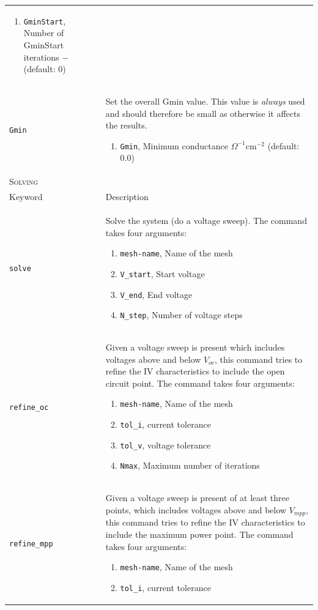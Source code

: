 \documentclass[noshowpacs,preprintnumbers,amsmath,amssymb, letter]{revtex4}
\begin{document}
\begin{longtable}{p{}p{}}
\begin{enumerate}
\item \texttt{GminStart}, Number of GminStart iterations $-$ (default: $0$)
\end{enumerate}\\
\texttt{Gmin} &  Set the overall Gmin value. This value is \emph{always} used and should therefore be small as otherwise it affects the results. 
\begin{enumerate}
\item \texttt{Gmin}, Minimum conductance $\Omega^{-1}\text{cm}^{-2}$ (default: $0.0$)
\end{enumerate}\\
\multicolumn{2}{l}{\textsc{Solving}} \\*
\hline
Keyword & Description \\
\texttt{solve}	&  Solve the system (do a voltage sweep). The command takes four arguments:
\begin{enumerate}
\item \texttt{mesh-name}, Name of the mesh
\item \texttt{V\_start}, Start voltage
\item \texttt{V\_end}, End voltage
\item \texttt{N\_step}, Number of voltage steps
\end{enumerate}\\
\texttt{refine\_oc}	&  Given a voltage sweep is present which includes voltages above and below $V_{oc}$, this command tries to refine the IV characteristics to include the open circuit point. The command takes four arguments:
\begin{enumerate}
\item \texttt{mesh-name}, Name of the mesh
\item \texttt{tol\_i}, current tolerance
\item \texttt{tol\_v}, voltage tolerance
\item \texttt{Nmax}, Maximum number of iterations
\end{enumerate}\\
\texttt{refine\_mpp}	&  Given a voltage sweep is present of at least three points, which includes voltages above and below $V_{mpp}$, this command tries to refine the IV characteristics to include the maximum power point. The command takes four arguments:
\begin{enumerate}
\item \texttt{mesh-name}, Name of the mesh
\item \texttt{tol\_i}, current tolerance

\end{enumerate}
\end{longtable}
\end{document}
